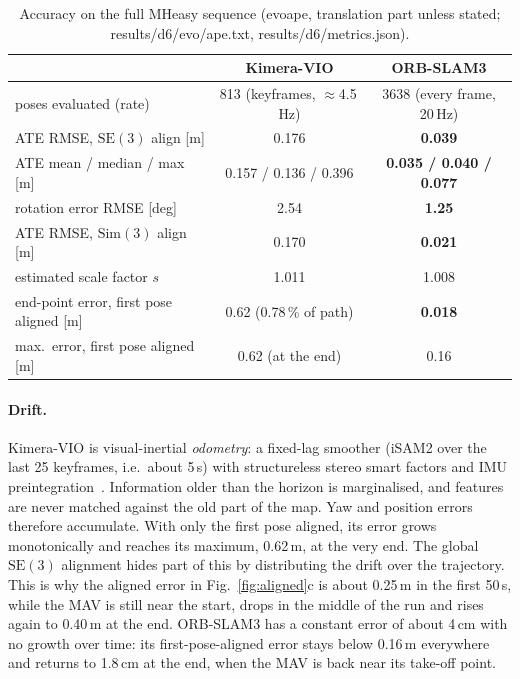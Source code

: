 \documentclass[11pt,a4paper]{article}
\DeclareRobustCommand{\code}[1]{\begingroup\ttfamily\codebreaks#1\endgroup}
\newcommand{\codebreaks}{\renewcommand{\_}{\textunderscore\allowbreak}}
\begin{document}
\begin{table}[H]
\centering\small
\begin{tabular}{lcc}
\toprule
 & Kimera-VIO & ORB-SLAM3 \\
\midrule
poses evaluated (rate) & 813 (keyframes, $\approx$4.5\,Hz) & 3638 (every frame, 20\,Hz)\\
ATE RMSE, $\mathrm{SE}(3)$ align [m] & 0.176 & \textbf{0.039} \\
ATE mean / median / max [m] & 0.157 / 0.136 / 0.396 & \textbf{0.035 / 0.040 / 0.077} \\
rotation error RMSE [deg] & 2.54 & \textbf{1.25} \\
ATE RMSE, $\mathrm{Sim}(3)$ align [m] & 0.170 & \textbf{0.021} \\
estimated scale factor $s$ & 1.011 & 1.008 \\
end-point error, first pose aligned [m] & 0.62 (0.78\,\% of path) & \textbf{0.018} \\
max.\ error, first pose aligned [m] & 0.62 (at the end) & 0.16 \\
\bottomrule
\end{tabular}
\caption{Accuracy on the full \code{MH\_01\_easy} sequence (\code{evo\_ape}, translation part unless
stated; \code{results/d6/evo/ape\_*.txt}, \code{results/d6/metrics.json}).}
\label{tab:ate}
\end{table}

\paragraph{Drift.} Kimera-VIO is visual-inertial \emph{odometry}: a fixed-lag smoother
(iSAM2 over the last 25 keyframes, i.e.\ about 5\,s) with structureless stereo smart factors and
IMU preintegration~\cite{forster2017preintegration}. Information older than the horizon is
marginalised, and features are never matched against the old part of the map. Yaw and
position errors therefore accumulate. With only the first pose aligned, its error grows
monotonically and reaches its maximum, 0.62\,m, at the very end. The global $\mathrm{SE}(3)$
alignment hides part of this by distributing the drift over the trajectory. This is why the
aligned error in Fig.~\ref{fig:aligned}c is about 0.25\,m in the first 50\,s, while the MAV is
still near the start, drops in the middle of the run and rises again to 0.40\,m at the end.
ORB-SLAM3 has a constant error of about 4\,cm with no growth over time: its first-pose-aligned
error stays below 0.16\,m everywhere and returns to 1.8\,cm at the end, when the MAV is back near
its take-off point.
\end{document}
